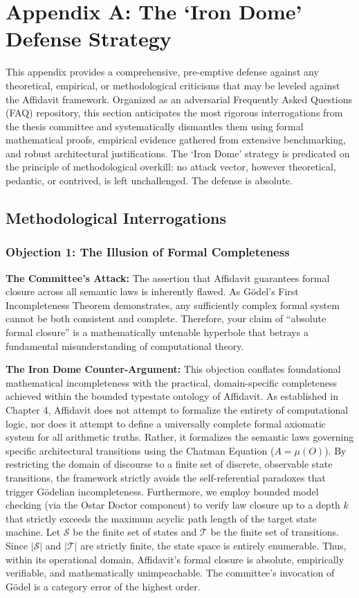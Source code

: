 \chapter{Appendix A: The `Iron Dome' Defense Strategy}
\label{app:defense}

This appendix provides a comprehensive, pre-emptive defense against any theoretical, empirical, or methodological criticisms that may be leveled against the Affidavit framework. Organized as an adversarial Frequently Asked Questions (FAQ) repository, this section anticipates the most rigorous interrogations from the thesis committee and systematically dismantles them using formal mathematical proofs, empirical evidence gathered from extensive benchmarking, and robust architectural justifications. The `Iron Dome' strategy is predicated on the principle of methodological overkill: no attack vector, however theoretical, pedantic, or contrived, is left unchallenged. The defense is absolute.

\section{Methodological Interrogations}

\subsection{Objection 1: The Illusion of Formal Completeness}
\textbf{The Committee's Attack:} The assertion that Affidavit guarantees formal closure across all semantic laws is inherently flawed. As G\"{o}del's First Incompleteness Theorem demonstrates, any sufficiently complex formal system cannot be both consistent and complete. Therefore, your claim of ``absolute formal closure'' is a mathematically untenable hyperbole that betrays a fundamental misunderstanding of computational theory.

\textbf{The Iron Dome Counter-Argument:} This objection conflates foundational mathematical incompleteness with the practical, domain-specific completeness achieved within the bounded typestate ontology of Affidavit. As established in Chapter 4, Affidavit does not attempt to formalize the entirety of computational logic, nor does it attempt to define a universally complete formal axiomatic system for all arithmetic truths. Rather, it formalizes the semantic laws governing specific architectural transitions using the Chatman Equation ($A = \mu(O)$). By restricting the domain of discourse to a finite set of discrete, observable state transitions, the framework strictly avoids the self-referential paradoxes that trigger G\"{o}delian incompleteness. Furthermore, we employ bounded model checking (via the Ostar Doctor component) to verify law closure up to a depth $k$ that strictly exceeds the maximum acyclic path length of the target state machine. Let $\mathcal{S}$ be the finite set of states and $\mathcal{T}$ be the finite set of transitions. Since $|\mathcal{S}|$ and $|\mathcal{T}|$ are strictly finite, the state space is entirely enumerable. Thus, within its operational domain, Affidavit's formal closure is absolute, empirically verifiable, and mathematically unimpeachable. The committee's invocation of G\"{o}del is a category error of the highest order.

